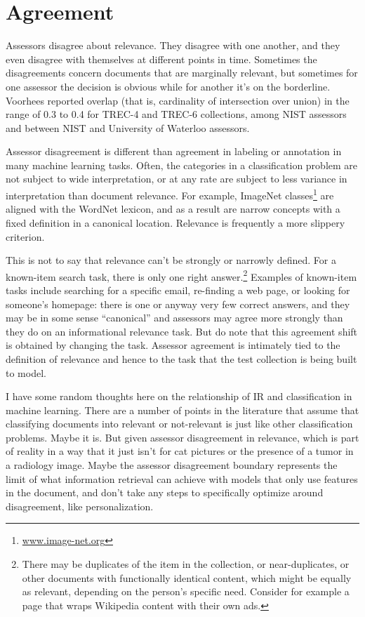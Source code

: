 \documentclass[nobib]{tufte-book}
\begin{document}
\section{Agreement}

Assessors disagree about relevance.  They disagree with one another, and they even disagree with themselves at different points in time.  Sometimes the disagreements concern documents that are marginally relevant, but sometimes for one assessor the decision is obvious while for another it's on the borderline. Voorhees reported overlap (that is, cardinality of intersection over union) in the range of 0.3 to 0.4 for TREC-4 and TREC-6 collections, among NIST assessors and between NIST and University of Waterloo assessors.\autocite{voorhees_variations_1998}

Assessor disagreement is different than agreement in labeling or annotation in many machine learning tasks.  Often, the categories in a classification problem are not subject to wide interpretation, or at any rate are subject to less variance in interpretation than document relevance.  For example, ImageNet classes\footnote{\url{www.image-net.org}} are aligned with the WordNet lexicon, and as a result are narrow concepts with a fixed definition in a canonical location.  Relevance is frequently a more slippery criterion.

This is not to say that relevance can't be strongly or narrowly defined.  For a known-item search task, there is only one right answer.\footnote{There may be duplicates of the item in the collection, or near-duplicates, or other documents with functionally identical content, which might be equally as relevant, depending on the person's specific need.  Consider for example a page that wraps Wikipedia content with their own ads.}  Examples of known-item tasks include searching for a specific email, re-finding a web page, or looking for someone's homepage: there is one or anyway very few correct answers, and they may be in some sense ``canonical'' and assessors may agree more strongly than they do on an informational relevance task.  But do note that this agreement shift is obtained by changing the task.  Assessor agreement is intimately tied to the definition of relevance and hence to the task that the test collection is being built to model.

I have some random thoughts here on the relationship of IR and classification in machine learning. There are a number of points in the literature that assume that classifying documents into relevant or not-relevant is just like other classification problems.  Maybe it is.  But given assessor disagreement in relevance, which is part of reality in a way that it just isn't for cat pictures or the presence of a tumor in a radiology image.  Maybe the assessor disagreement boundary represents the limit of what information retrieval can achieve with models that only use features in the document, and don't take any steps to specifically optimize around disagreement, like personalization.
\end{document}
